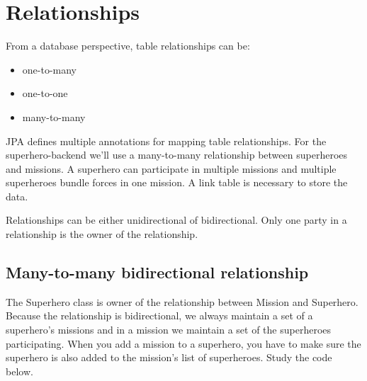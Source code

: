 \section{Relationships}

From a database perspective, table relationships can be:
\begin{itemize}
\item one-to-many
\item one-to-one
\item many-to-many
\end{itemize}

JPA defines multiple annotations for mapping table relationships. For the superhero-backend we'll use a many-to-many relationship between superheroes and missions. A superhero can participate in multiple missions and multiple superheroes bundle forces in one mission. A link table is necessary to store the data.

Relationships can be either unidirectional of bidirectional. Only one party in a relationship is the owner of the relationship. 
 

\subsection{Many-to-many bidirectional relationship}

The Superhero class is owner of the relationship between Mission and Superhero. Because the relationship is bidirectional, we always maintain a set of a superhero's missions and in a mission we maintain a set of the superheroes participating.
When you add a mission to a superhero, you have to make sure the superhero is also added to the mission's list of superheroes.
Study the code below.


